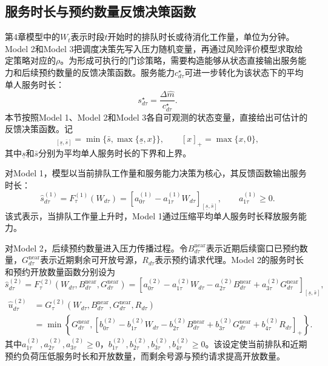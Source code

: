 \documentclass[a4paper,zihao=-4]{ctexart}
\numberwithin{figure}{section}
\numberwithin{table}{section}
\begin{document}
\subsection{服务时长与预约数量反馈决策函数}

第4章模型中的$W_t$表示时段$t$开始时的排队时长或待消化工作量，单位为分钟。Model 2和Model 3把调度决策先写入压力随机变量，再通过风险评价模型求取给定策略对应的$\rho$。为形成可执行的门诊策略，需要构造能够从状态直接输出服务能力和后续预约数量的反馈决策函数。服务能力$c_{d\tau}^{\star}$可进一步转化为该状态下的平均单人服务时长：
\begin{equation}
s_{d\tau}^\star=\frac{\Delta\hat m}{c_{d\tau}^{\star}}.
\label{eq:service-time-mapping}
\end{equation}
本节按照Model 1、Model 2和Model 3各自可观测的状态变量，直接给出可估计的反馈决策函数。记
\begin{equation}
[x]_{[\underline s,\bar s]}=\min\{\bar s,\max\{\underline s,x\}\},\qquad [x]_+=\max\{x,0\},
\end{equation}
其中$\underline s$和$\bar s$分别为平均单人服务时长的下界和上界。

对Model 1，模型以当前排队工作量和服务能力决策为核心，其反馈函数输出服务时长：
\begin{equation}
\hat s_{d\tau}^{(1)}
=F_{\tau}^{(1)}(W_{d\tau})
=\left[a_{0\tau}^{(1)}-a_{1\tau}^{(1)}W_{d\tau}\right]_{[\underline s,\bar s]},
\qquad a_{1\tau}^{(1)}\geq0 .
\label{eq:model1-feedback-function}
\end{equation}
该式表示，当排队工作量上升时，Model 1通过压缩平均单人服务时长释放服务能力。

对Model 2，后续预约数量进入压力传播过程。令$B_{d\tau}^{\mathrm{near}}$表示近期后续窗口已预约数量，$G_{d\tau}^{\mathrm{near}}$表示近期剩余可开放号源，$R_{d\tau}$表示预约请求代理。Model 2的服务时长和预约开放数量函数分别设为
\begin{equation}
\hat s_{d\tau}^{(2)}
=F_{\tau}^{(2)}(W_{d\tau},B_{d\tau}^{\mathrm{near}},G_{d\tau}^{\mathrm{near}})
=\left[
a_{0\tau}^{(2)}-a_{1\tau}^{(2)}W_{d\tau}
-a_{2\tau}^{(2)}B_{d\tau}^{\mathrm{near}}
+a_{3\tau}^{(2)}G_{d\tau}^{\mathrm{near}}
\right]_{[\underline s,\bar s]},
\label{eq:model2-service-feedback-function}
\end{equation}
\begin{equation}
\begin{aligned}
\hat u_{d\tau}^{(2)}
&=G_{\tau}^{(2)}(W_{d\tau},B_{d\tau}^{\mathrm{near}},
G_{d\tau}^{\mathrm{near}},R_{d\tau})\\
&=\min\left\{
G_{d\tau}^{\mathrm{near}},
\left[
b_{0\tau}^{(2)}-b_{1\tau}^{(2)}W_{d\tau}
-b_{2\tau}^{(2)}B_{d\tau}^{\mathrm{near}}
+b_{3\tau}^{(2)}G_{d\tau}^{\mathrm{near}}
+b_{4\tau}^{(2)}R_{d\tau}
\right]_+
\right\}.
\end{aligned}
\label{eq:model2-booking-feedback-function}
\end{equation}
其中$a_{1\tau}^{(2)},a_{2\tau}^{(2)},a_{3\tau}^{(2)}\geq0$，$b_{1\tau}^{(2)},b_{2\tau}^{(2)},b_{3\tau}^{(2)},b_{4\tau}^{(2)}\geq0$。该设定使当前排队和近期预约负荷压低服务时长和开放数量，而剩余号源与预约请求提高开放数量。
\end{document}
